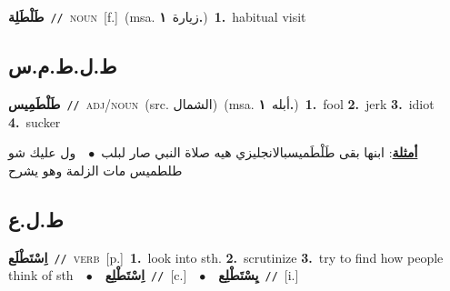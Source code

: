 \documentclass[10pt,a4paper,twoside]{article} %
\begin{document}
\begin{multicols}{2}
{\setlength\topsep{0pt}\textbf{\foreignlanguage{arabic}{طَلْطَلِة}}\ {\color{gray}\texttt{//}\color{black}}\ \textsc{noun}\ [f.]\ \color{gray}(msa. \foreignlanguage{arabic}{زيارة}~\foreignlanguage{arabic}{\textbf{١.}})\color{black}\ \textbf{1.}~habitual visit\ } \vspace{2mm}

\vspace{-3mm}
\subsection*{\color{blue}\foreignlanguage{arabic}{ط.ل.ط.م.س}\color{blue}{ (ntws)}} 

{\setlength\topsep{0pt}\textbf{\foreignlanguage{arabic}{طَلْطَمِيس}}\ {\color{gray}\texttt{//}\color{black}}\ \textsc{adj/noun}\ (src. \color{gray}\foreignlanguage{arabic}{الشمال}\color{black})\ \color{gray}(msa. \foreignlanguage{arabic}{أبله}~\foreignlanguage{arabic}{\textbf{١.}})\color{black}\ \textbf{1.}~fool  \textbf{2.}~jerk  \textbf{3.}~idiot  \textbf{4.}~sucker\  \begin{flushright}\color{gray}\foreignlanguage{arabic}{\textbf{\underline{\foreignlanguage{arabic}{أمثلة}}}: ابنها بقى طَلْطَميسبالانجليزي هيه صلاة النبي صار لبلب\ $\bullet$\ \  ول عليك شو طلطميس مات الزلمة وهو يشرح}\end{flushright}\color{black}} \vspace{2mm}

\vspace{-3mm}
\subsection*{\color{blue}\foreignlanguage{arabic}{ط.ل.ع}\color{blue}{}} 

{\setlength\topsep{0pt}\textbf{\foreignlanguage{arabic}{اِسْتَطْلَع}}\ {\color{gray}\texttt{//}\color{black}}\ \textsc{verb}\ [p.]\ \textbf{1.}~look into sth.  \textbf{2.}~scrutinize  \textbf{3.}~try to find how people think of sth\ \ $\bullet$\ \ \setlength\topsep{0pt}\textbf{\foreignlanguage{arabic}{اِسْتَطْلِع}}\ {\color{gray}\texttt{//}\color{black}}\ [c.]\ \ $\bullet$\ \ \setlength\topsep{0pt}\textbf{\foreignlanguage{arabic}{يِسْتَطْلِع}}\ {\color{gray}\texttt{//}\color{black}}\ [i.]\ } \vspace{2mm}


\end{multicols}
\end{document}
